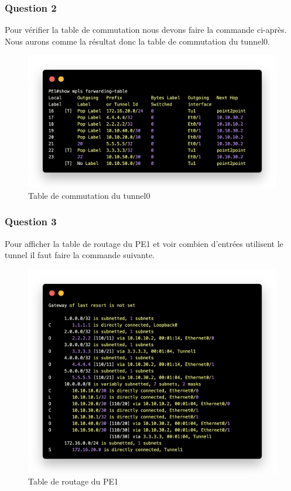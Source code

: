 \documentclass[12pt, a4paper]{article}
\begin{document}
\subsubsection{Question 2}
Pour vérifier la table de commutation nous devons faire la commande ci-après. Nous 
aurons comme la résultat donc la table de commutation du tunnel0.
\begin{figure}[h]
    \centering
    \includegraphics[width=1\textwidth]{img/code4.png}
    \caption{Table de commutation du tunnel0}
    \label{fig:script4}
\end{figure}

\newpage
\subsubsection{Question 3}
Pour afficher la table de routage du PE1 et voir combien d’entrées utilisent le tunnel
il faut faire la commande suivante. 

\begin{figure}[h]
    \centering
    \includegraphics[width=1\textwidth]{img/code5.png}
    \caption{Table de routage du PE1}
    \label{fig:script5}
\end{figure}
\newpage
\end{document}
